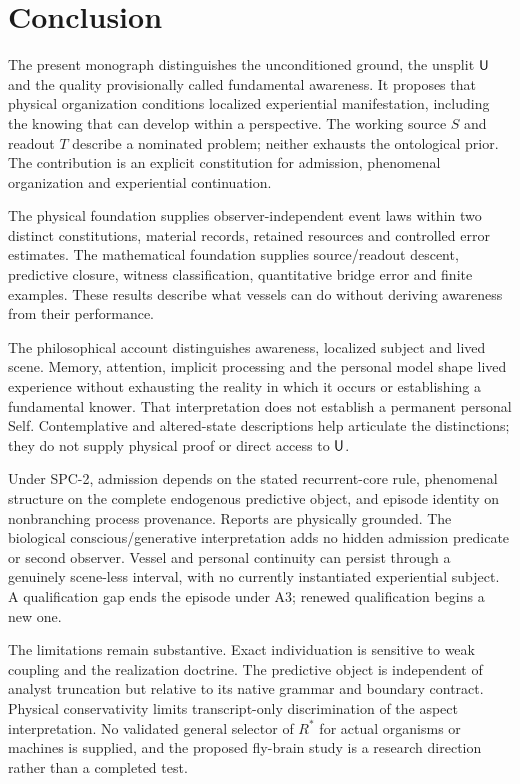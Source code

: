 \chapter{Conclusion}\label{ch:conclusion}
The present monograph distinguishes the unconditioned ground, the unsplit $\mathsf{U}$ and the quality provisionally called fundamental awareness. It proposes that physical organization conditions localized experiential manifestation, including the knowing that can develop within a perspective. The working source $S$ and readout $T$ describe a nominated problem; neither exhausts the ontological prior. The contribution is an explicit constitution for admission, phenomenal organization and experiential continuation.

The physical foundation supplies observer-independent event laws within two distinct constitutions, material records, retained resources and controlled error estimates. The mathematical foundation supplies source/readout descent, predictive closure, witness classification, quantitative bridge error and finite examples. These results describe what vessels can do without deriving awareness from their performance.

The philosophical account distinguishes awareness, localized subject and lived scene. Memory, attention, implicit processing and the personal model shape lived experience without exhausting the reality in which it occurs or establishing a fundamental knower. That interpretation does not establish a permanent personal Self. Contemplative and altered-state descriptions help articulate the distinctions; they do not supply physical proof or direct access to $\mathsf{U}$.

Under SPC-2, admission depends on the stated recurrent-core rule, phenomenal structure on the complete endogenous predictive object, and episode identity on nonbranching process provenance. Reports are physically grounded. The biological conscious/generative interpretation adds no hidden admission predicate or second observer. Vessel and personal continuity can persist through a genuinely scene-less interval, with no currently instantiated experiential subject. A qualification gap ends the episode under A3; renewed qualification begins a new one.

The limitations remain substantive. Exact individuation is sensitive to weak coupling and the realization doctrine. The predictive object is independent of analyst truncation but relative to its native grammar and boundary contract. Physical conservativity limits transcript-only discrimination of the aspect interpretation. No validated general selector of $R^\ast$ for actual organisms or machines is supplied, and the proposed fly-brain study is a research direction rather than a completed test.

